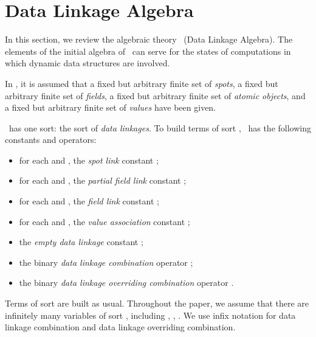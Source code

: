 \documentclass[fleqn]{llncs}
\begin{document}
\section{Data Linkage Algebra}
\label{sect-DLA}

In this section, we review the algebraic theory \DLA\ (Data Linkage
Algebra).
The elements of the initial algebra of \DLA\ can serve for the states of
computations in which dynamic data structures are involved.

In \DLA, it is assumed that a fixed but arbitrary finite set  of
\emph{spots}, a fixed but arbitrary finite set  of
\emph{fields}, a fixed but arbitrary finite set  of \emph{atomic
objects}, and a fixed but arbitrary finite set  of \emph{values}
have been given.

\DLA\ has one sort: the sort  of \emph{data linkages}.
To build terms of sort , \BTA\ has the following constants and
operators:
\begin{itemize}
\item
for each  and ,
the \emph{spot link} constant ;
\item
for each  and ,
the \emph{partial field link} constant ;
\item
for each  and ,
the \emph{field link} constant ;
\item
for each  and ,
the \emph{value association} constant ;
\item
the \emph{empty data linkage} constant ;
\item
the binary \emph{data linkage combination} operator
;
\item
the binary \emph{data linkage overriding combination} operator
.
\end{itemize}
Terms of sort  are built as usual.
Throughout the paper, we assume that there are infinitely many variables
of sort , including , , .
We use infix notation for data linkage combination and data linkage
overriding combination.
\end{document}
